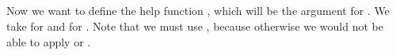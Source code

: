 \begin{code}%
\>[0]\AgdaSpace{}%
\AgdaSymbol{:}\AgdaSpace{}%
\AgdaSymbol{\{}\AgdaSpace{}%
\AgdaSpace{}%
\AgdaSymbol{:}\AgdaSpace{}%
\AgdaSymbol{\}}\AgdaSpace{}%
\AgdaSpace{}%
\AgdaSymbol{(}\AgdaSpace{}%
\AgdaSpace{}%
\AgdaSpace{}%
\AgdaSpace{}%
\AgdaSpace{}%
\AgdaSymbol{)}\AgdaSpace{}%
\AgdaSpace{}%
\AgdaSymbol{(}\AgdaSymbol{(}\AgdaSpace{}%
\AgdaSpace{}%
\AgdaSymbol{)}\AgdaSpace{}%
\AgdaSpace{}%
\AgdaSpace{}%
\AgdaSpace{}%
\AgdaSymbol{)}\<%
\\
\>[0]\AgdaSpace{}%
\AgdaSpace{}%
\AgdaSpace{}%
\AgdaSymbol{=}\AgdaSpace{}%
\AgdaSpace{}%
\AgdaSymbol{(}\AgdaSpace{}%
\AgdaSpace{}%
\AgdaSpace{}%
\AgdaSymbol{)}\<%
\\
%
\\[\AgdaEmptyExtraSkip]%
\>[0]\AgdaSpace{}%
\AgdaSymbol{:}\AgdaSpace{}%
\AgdaSymbol{\{}\AgdaSpace{}%
\AgdaSpace{}%
\AgdaSymbol{:}\AgdaSpace{}%
\AgdaSymbol{\}}\AgdaSpace{}%
\AgdaSpace{}%
\AgdaSymbol{(}\AgdaSpace{}%
\AgdaSpace{}%
\AgdaSpace{}%
\AgdaSpace{}%
\AgdaSpace{}%
\AgdaSymbol{)}\AgdaSpace{}%
\AgdaSpace{}%
\AgdaSpace{}%
\<%
\\
\>[0]\AgdaSpace{}%
\AgdaSpace{}%
\AgdaSymbol{=}\AgdaSpace{}%
\AgdaSpace{}%
\AgdaSymbol{(}\AgdaSpace{}%
\AgdaSymbol{(}\AgdaSpace{}%
\AgdaSymbol{))}\<%
\end{code}

Now we want to define the help function , which will be the argument for .
We take  for  and  for .
Note that we must use , because otherwise we would not be able to apply  or .


